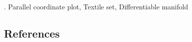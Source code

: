 \documentclass[12pt]{article}
\begin{document}
\vskip 2mm

.
Parallel coordinate plot, Textile set, Differentiable manifold  

%
%        

\subsection*{References}
\end{document}
